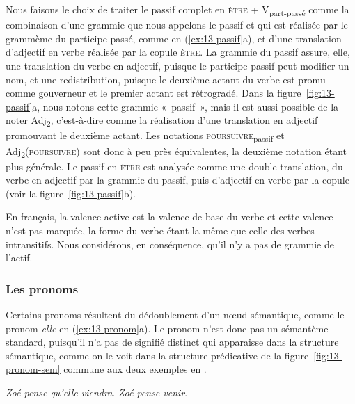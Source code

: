 Nous faisons le choix de traiter le passif complet en \textsc{être} + V\textsubscript{part-passé} comme la combinaison d'une grammie que nous appelons le passif et qui est réalisée par le grammème du participe passé, comme en (\ref{ex:13-passif}a), et d'une translation d'adjectif en verbe réalisée par la copule \textsc{être}. La grammie du passif assure, elle, une translation du verbe en adjectif, puisque le participe passif peut modifier un nom, et une redistribution, puisque le deuxième actant du verbe est promu comme gouverneur et le premier actant est rétrogradé. Dans la figure~\ref{fig:13-passif}a, nous notons cette grammie «~passif~», mais il est aussi possible de la noter Adj\textsubscript{2}, c'est-à-dire comme la réalisation d'une translation en adjectif promouvant le deuxième actant. Les notations \textsc{poursuivre}\textsubscript{passif} et Adj\textsubscript{2}(\textsc{poursuivre}) sont donc à peu près équivalentes, la deuxième notation étant plus générale. Le passif en \textsc{être} est analysée comme une double translation, du verbe en adjectif par la grammie du passif, puis d’adjectif en verbe par la copule (voir la figure~\ref{fig:13-passif}b).

En français, la valence active est la valence de base du verbe et cette valence n'est pas marquée, la forme du verbe étant la même que celle des verbes intransitifs.  Nous considérons, en conséquence, qu'il n'y a pas de grammie de l'actif.

\subsubsection{Les pronoms}
Certains pronoms résultent du dédoublement d’un nœud sémantique, comme le pronom \textit{elle} en (\ref{ex:13-pronom}a). Le pronom n’est donc pas un sémantème standard, puisqu’il n’a pas de signifié distinct qui apparaisse dans la structure sémantique, comme on le voit dans la structure prédicative de la figure~\ref{fig:13-pronom-sem} commune aux deux exemples en .

\ea\label{ex:13-pronom}
\ea \textit{Zoé pense qu’elle viendra}.
\ex \textit{Zoé pense venir}.\z\z

